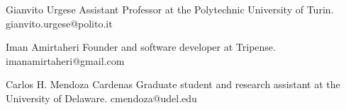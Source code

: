 

\begin{cvrefs}

    \cvref
    {Gianvito Urgese}
    {Assistant Professor at the Polytechnic University of Turin.}
	{gianvito.urgese@polito.it}

    \cvref
    {Iman Amirtaheri}
    {Founder and software developer at Tripense.}
	{imanamirtaheri@gmail.com}

    \cvref
    {Carlos H. Mendoza Cardenas}
    {Graduate student and research assistant at the University of Delaware.}
	{cmendoza@udel.edu}

\end{cvrefs}

